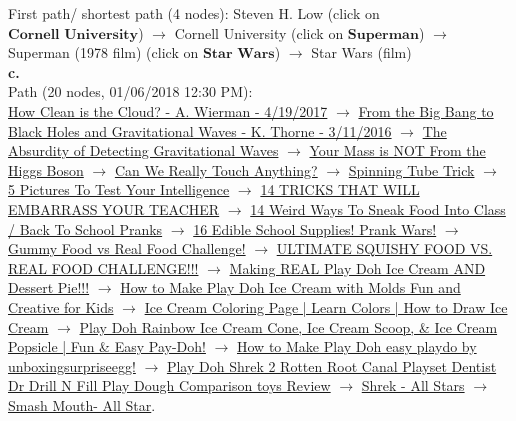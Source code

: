 \documentclass[12 pt]{article}
\begin{document}
	\noindent First path/ shortest path (4 nodes): Steven H. Low (click on $\textbf{Cornell University}$) $\rightarrow$ Cornell University (click on $\textbf{Superman}$) $\rightarrow$ Superman (1978 film) (click on $\textbf{Star Wars}$) $\rightarrow$ Star Wars (film) \\
	
	\noindent \textbf{c.} \\
	Path (20 nodes, 01/06/2018 12:30 PM): \\ \href{https://www.youtube.com/watch?v=uC7llVi1gNs&t=51s}{How Clean is the Cloud? - A. Wierman - 4/19/2017} $\rightarrow$ \href{https://www.youtube.com/watch?v=NMxo98Y-KoE}{From the Big Bang to Black Holes and Gravitational Waves - K. Thorne - 3/11/2016} $\rightarrow$ \href{https://www.youtube.com/watch?v=iphcyNWFD10}{The Absurdity of Detecting Gravitational Waves} $\rightarrow$ \href{https://www.youtube.com/watch?v=Ztc6QPNUqls}{Your Mass is NOT From the Higgs Boson} $\rightarrow$ \href{https://www.youtube.com/watch?v=bKldI-XGHIw}{Can We Really Touch Anything?} $\rightarrow$ \href{https://www.youtube.com/watch?v=wQTVcaA3PQw}{Spinning Tube Trick} $\rightarrow$ \href{https://www.youtube.com/watch?v=XA-gJx046qE}{5 Pictures To Test Your Intelligence} $\rightarrow$ \href{https://www.youtube.com/watch?v=LcpliVYfEqk}{14 TRICKS THAT WILL EMBARRASS YOUR TEACHER} $\rightarrow$ \href{https://www.youtube.com/watch?v=W5p2ndS34vA}{14 Weird Ways To Sneak Food Into Class / Back To School Pranks} $\rightarrow$ \href{https://www.youtube.com/watch?v=E9aPzuA7sJI}{16 Edible School Supplies! Prank Wars!} $\rightarrow$ \href{https://www.youtube.com/watch?v=jBIG6GsQcq8}{Gummy Food vs Real Food Challenge!} $\rightarrow$ \href{https://www.youtube.com/watch?v=xjJ7KEEpHzo}{ULTIMATE SQUISHY FOOD VS. REAL FOOD CHALLENGE!!!} $\rightarrow$
	\href{https://www.youtube.com/watch?v=oIEOvk0iggE}{Making REAL Play Doh Ice Cream AND Dessert Pie!!!} $\rightarrow$
	\href{https://www.youtube.com/watch?v=CMNg8h7OJoQ}{How to Make Play Doh Ice Cream with Molds Fun and Creative for Kids} $\rightarrow$
	\href{https://www.youtube.com/watch?v=YlNvPnLlvWo}{Ice Cream Coloring Page | Learn Colors | How to Draw Ice Cream} $\rightarrow$
	\href{https://www.youtube.com/watch?v=cMGNGt7CzYg}{Play Doh Rainbow Ice Cream Cone, Ice Cream Scoop, \& Ice Cream Popsicle | Fun \& Easy Pay-Doh!} $\rightarrow$ \href{https://www.youtube.com/watch?v=sfP_981nbPg}{How to Make Play Doh easy playdo by unboxingsurpriseegg!} $\rightarrow$ \href{https://www.youtube.com/watch?v=ER_CWcqF36o}{Play Doh Shrek 2 Rotten Root Canal Playset Dentist Dr Drill N Fill Play Dough Comparison toys Review} $\rightarrow$
 	\href{https://www.youtube.com/watch?v=engvN0hY8Bo}{Shrek - All Stars} $\rightarrow$  	\href{https://www.youtube.com/watch?v=L_jWHffIx5E}{Smash Mouth- All Star}. \\
 	
\end{document}

